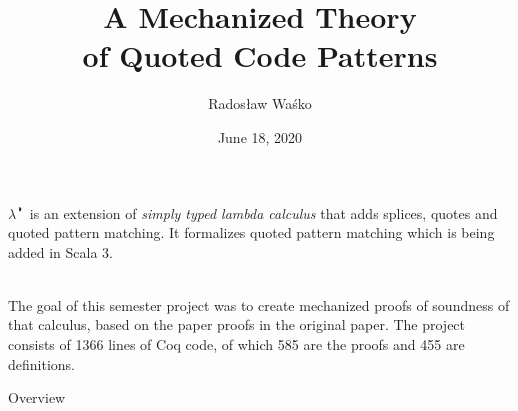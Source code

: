 \documentclass{beamer}
\title{A Mechanized Theory \\ of Quoted Code Patterns}
\author{Radosław Waśko}
\date{June 18, 2020}
\newcommand{\calculus}{$\lambda^{\RIGHTcircle}$}
\begin{document}
  \begin{frame}
  \titlepage
\end{frame}
\begin{frame}
  \calculus \, is an extension of \textit{simply typed lambda calculus} that adds splices, quotes and quoted pattern matching. It formalizes quoted pattern matching which is being added in Scala 3. \\~\
  
  The goal of this semester project was to create mechanized proofs of soundness of that calculus, based on the paper proofs in the original paper. The project consists of 1366 lines of Coq code, of which 585 are the proofs and 455 are definitions.
  
\end{frame}
\begin{frame}{Overview}
  \tableofcontents
  
\end{frame}
\end{document}
